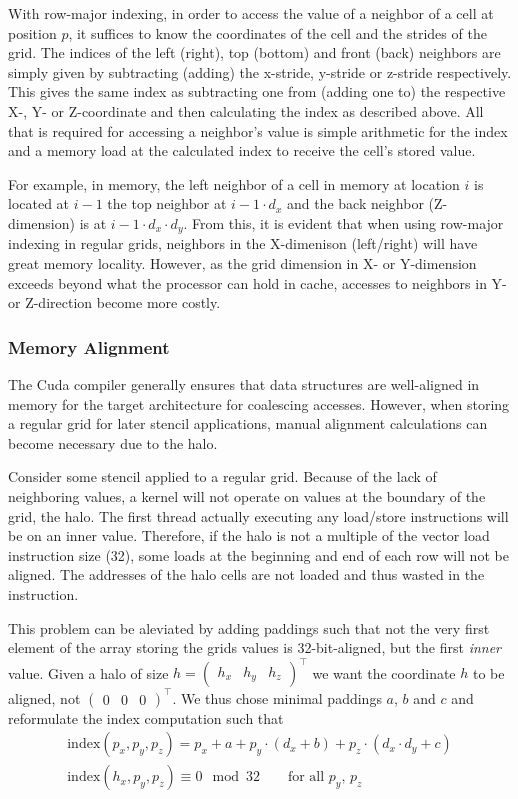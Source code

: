 With row-major indexing, in order to access the value of a neighbor of a cell at position $p$, it suffices to know the coordinates of the cell and the strides of the grid. The indices of the left (right), top (bottom) and front (back) neighbors are simply given by subtracting (adding) the x-stride, y-stride or z-stride respectively. This gives the same index as subtracting one from (adding one to) the respective X-, Y- or Z-coordinate and then calculating the index as described above. All that is required for accessing a neighbor's value is simple arithmetic for the index and a memory load at the calculated index to receive the cell's stored value.

For example, in memory, the left neighbor of a cell in memory at location $i$ is located at $i-1$ the top neighbor at $i-1\cdot d_x$ and the back neighbor (Z-dimension) is at $i-1\cdot d_x\cdot d_y$. From this, it is evident that when using row-major indexing in regular grids, neighbors in the X-dimenison (left/right) will have great memory locality. However, as the grid dimension in X- or Y-dimension exceeds beyond what the processor can hold in cache, accesses to neighbors in Y- or Z-direction become more costly. 

\subsubsection{Memory Alignment}

The Cuda compiler generally ensures that data structures are well-aligned in memory for the target architecture for coalescing accesses. However, when storing a regular grid for later stencil applications, manual alignment calculations can become necessary due to the halo. 

Consider some stencil applied to a regular grid. Because of the lack of neighboring values, a kernel will not operate on values at the boundary of the grid, the halo. The first thread actually executing any load/store instructions will be on an inner value. Therefore, if the halo is not a multiple of the vector load instruction size (32), some loads at the beginning and end of each row will not be aligned. The addresses of the halo cells are not loaded and thus wasted in the instruction.

This problem can be aleviated by adding paddings such that not the very first element of the array storing the grids values is 32-bit-aligned, but the first \emph{inner} value. Given a halo of size $h = \begin{pmatrix}h_x & h_y & h_z\end{pmatrix}^\top$ we want the coordinate $h$ to be aligned, not $\begin{pmatrix} 0 & 0 & 0\end{pmatrix}^\top$. We thus chose minimal paddings $a$, $b$ and $c$ and reformulate the index computation such that
\begin{gather}
	\text{index}\left(p_x, p_y, p_z\right) = p_x + a + p_y \cdot \left(d_x + b\right) + p_z \cdot \left(d_x \cdot d_y + c\right)
	\\
	\text{index}\left(h_x, p_y, p_z\right) \equiv 0 \mod 32 \qquad \text{for all $p_y$, $p_z$}
\end{gather}

